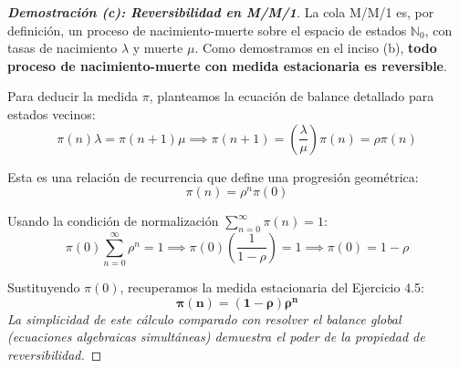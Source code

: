 \documentclass[10pt,a4paper]{article}
\begin{document}
\begin{proof}[\textbf{Demostración (c): Reversibilidad en M/M/1}]
    La cola M/M/1 es, por definición, un proceso de nacimiento-muerte sobre el espacio de estados $\mathbb{N}_0$, con tasas de nacimiento $\lambda$ y muerte $\mu$. 
    Como demostramos en el inciso (b), \textbf{todo proceso de nacimiento-muerte con medida estacionaria es reversible}.
    
    Para deducir la medida $\pi$, planteamos la ecuación de balance detallado para estados vecinos:
    \[ \pi(n)\lambda = \pi(n+1)\mu \implies \pi(n+1) = \left(\frac{\lambda}{\mu}\right)\pi(n) = \rho \pi(n) \]
    
    Esta es una relación de recurrencia que define una progresión geométrica:
    \[ \pi(n) = \rho^n \pi(0) \]
    
    Usando la condición de normalización $\sum_{n=0}^\infty \pi(n) = 1$:
    \[ \pi(0) \sum_{n=0}^\infty \rho^n = 1 \implies \pi(0) \left(\frac{1}{1-\rho}\right) = 1 \implies \pi(0) = 1-\rho \]
    
    Sustituyendo $\pi(0)$, recuperamos la medida estacionaria del Ejercicio 4.5:
    \[ \mathbf{\pi(n) = (1-\rho)\rho^n} \]
    \textit{La simplicidad de este cálculo comparado con resolver el balance global (ecuaciones algebraicas simultáneas) demuestra el poder de la propiedad de reversibilidad.}
\end{proof}

\newpage
\end{document}
